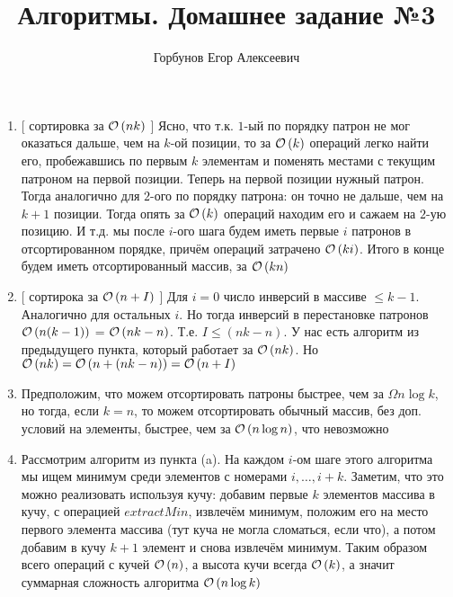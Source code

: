 
\title{Алгоритмы. Домашнее задание №3}
\author{Горбунов Егор Алексеевич}


\maketitle

\begin{enumerate}[label=(\alph*)]
\item \small[ сортировка за $\mathcal{O}\left(nk\right)$ \small] Ясно, что т.к. $1$-ый по порядку патрон не мог оказаться дальше, чем на $k$-ой позиции, то
за $\mathcal{O}\left(k\right)$ операций легко найти его, пробежавшись по первым $k$ элементам и поменять местами с текущим патроном на первой позиции. Теперь на первой позиции нужный патрон. Тогда аналогично для $2$-ого по порядку патрона: он точно не дальше, чем на $k+1$ позиции. Тогда опять за $\mathcal{O}\left(k\right)$ операций находим его и сажаем на $2$-ую позицию. И т.д. мы после $i$-ого шага будем иметь первые $i$ патронов в отсортированном порядке, причём операций затрачено $\mathcal{O}\left(ki\right)$. Итого в конце будем иметь отсортированный массив, за $\mathcal{O}\left(kn\right)$ \xqed
\item \small[ сортирока за $\mathcal{O}\left(n+I\right)$ \small] Для $i=0$ число инверсий в массиве $\leq k-1$. Аналогично для остальных $i$. Но тогда инверсий в перестановке патронов $\mathcal{O}\left(n(k-1)\right)$ = $\mathcal{O}\left(nk-n\right)$. Т.е. $I \leq (nk-n)$. У нас есть алгоритм из предыдущего пункта, который работает за $\mathcal{O}\left(nk\right)$. Но $\mathcal{O}\left(nk\right)=\mathcal{O}\left(n + (nk-n)\right)=\mathcal{O}\left(n+I\right)$ \xqed
\item Предположим, что можем отсортировать патроны быстрее, чем за $\Omega{n\log{k}}$, но тогда, если $k=n$, то можем отсортировать обычный массив, без доп. условий на элементы, быстрее, чем за $\mathcal{O}\left(n\log{n}\right)$, что невозможно \xqed
\item Рассмотрим алгоритм из пункта (a). На каждом $i$-ом шаге этого алгоритма мы ищем минимум среди элементов с номерами $i,\ldots,i+k$. Заметим, что это можно реализовать используя кучу: добавим первые $k$ элементов массива в кучу, с операцией $extractMin$, извлечём минимум, положим его на место первого элемента массива (тут куча не могла сломаться, если что), а потом добавим в кучу $k+1$ элемент и снова извлечём минимум. Таким образом всего операций с кучей $\mathcal{O}\left(n\right)$, а высота кучи всегда $\mathcal{O}\left(k\right)$, а значит суммарная сложность алгоритма $\mathcal{O}\left(n\log{k}\right)$ \xqed
\end{enumerate}


